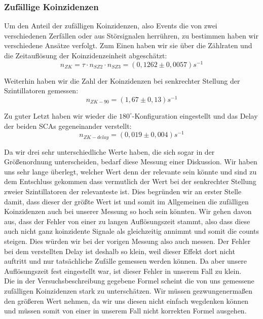 \subsubsection{Zufällige Koinzidenzen}

Um den Anteil der zufälligen Koinzidenzen, also Events die von zwei verschiedenen Zerfällen oder aus Störsignalen herrühren, zu bestimmen haben wir verschiedene Ansätze verfolgt. Zum Einen haben wir sie über die Zählraten und die Zeitauflösung der Koinzidenzeinheit abgeschätzt:
\begin{equation*}
 n_{ZK} = \tau \cdot n_{SZ2} \cdot n_{SZ3} = (0,1262 \pm 0,0057) s^{-1}
\end{equation*}

Weiterhin haben wir die Zahl der Koinzidenzen bei senkrechter Stellung der Szintillatoren gemessen:
\begin{equation*}
 n_{ZK-90} = (1,67  \pm  0,13) s^{-1}
\end{equation*}

Zu guter Letzt haben wir wieder die $180^\circ$-Konfiguration eingestellt und das Delay der beiden SCAs gegeneinander verstellt: 
\begin{equation*}
 n_{ZK-delay} = (0,019  \pm  0,004) s^{-1}
\end{equation*}

Da wir drei sehr unterschiedliche Werte haben, die sich sogar in der Größenordnung unterscheiden, bedarf diese Messung einer Diskussion. Wir haben uns sehr lange überlegt, welcher Wert denn der relevante sein könnte und sind zu dem Entschluss gekommen dass vermutlich der Wert bei der senkrechter Stellung zweier Szintillatoren der relevanteste ist. Dies begründen wir an erster Stelle damit, dass dieser der größte Wert ist und somit im Allgemeinen die zufälligen Koinzidenzen auch bei unserer Messung so hoch sein könnten. Wir gehen davon aus, dass der Fehler von einer zu langen Auflösungszeit stammt, also dass diese auch nicht ganz koinzidente Signale als gleichzeitig annimmt und somit die counts steigen. Dies würden wir bei der vorigen Messung also auch messen. Der Fehler bei dem verstellten Delay ist deshalb so klein, weil dieser Effekt dort nicht auftritt und nur tatsächliche Zufälle gemessen werden können. Da aber unsere Auflösungszeit fest eingestellt war, ist dieser Fehler in unserem Fall zu klein. \\

Die in der Versuchsbeschreibung gegebene Formel scheint die von uns gemessene zufälligen Koinzidenzen stark zu unterschätzen. Wir müssen gezwungenermaßen den größeren Wert nehmen, da wir uns diesen nicht einfach wegdenken können und müssen somit von einer in unserem Fall nicht korrekten Formel ausgehen.
 
